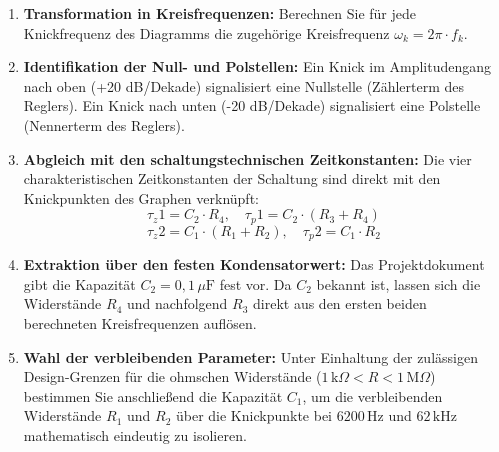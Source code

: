 \documentclass[11pt,a4paper]{article}
\begin{document}
\begin{enumerate}
    \item \textbf{Transformation in Kreisfrequenzen:} Berechnen Sie für jede Knickfrequenz des Diagramms die zugehörige Kreisfrequenz $\omega_k = 2\pi \cdot f_k$.
    \item \textbf{Identifikation der Null- und Polstellen:} Ein Knick im Amplitudengang nach oben (+20 dB/Dekade) signalisiert eine Nullstelle (Zählerterm des Reglers). Ein Knick nach unten (-20 dB/Dekade) signalisiert eine Polstelle (Nennerterm des Reglers).
    \item \textbf{Abgleich mit den schaltungstechnischen Zeitkonstanten:}
    Die vier charakteristischen Zeitkonstanten der Schaltung sind direkt mit den Knickpunkten des Graphen verknüpft:
    \begin{equation}
    \tau_z1 = C_2 \cdot R_4, \quad \tau_p1 = C_2 \cdot (R_3 + R_4)
    \end{equation}
    \begin{equation}
    \tau_z2 = C_1 \cdot (R_1 + R_2), \quad \tau_p2 = C_1 \cdot R_2
    \end{equation}
    \item \textbf{Extraktion über den festen Kondensatorwert:} Das Projektdokument gibt die Kapazität $C_2 = 0{,}1\,\mu\text{F}$ fest vor. Da $C_2$ bekannt ist, lassen sich die Widerstände $R_4$ und nachfolgend $R_3$ direkt aus den ersten beiden berechneten Kreisfrequenzen auflösen. 
    \item \textbf{Wahl der verbleibenden Parameter:} Unter Einhaltung der zulässigen Design-Grenzen für die ohmschen Widerstände ($1\,\text{k}\Omega < R < 1\,\text{M}\Omega$) bestimmen Sie anschließend die Kapazität $C_1$, um die verbleibenden Widerstände $R_1$ und $R_2$ über die Knickpunkte bei $6200\,\text{Hz}$ und $62\,\text{kHz}$ mathematisch eindeutig zu isolieren.
\end{enumerate}
\end{document}
